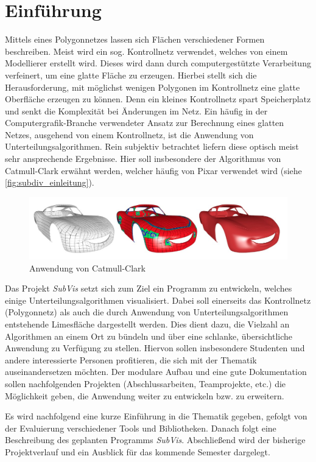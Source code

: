 \chapter{Einführung}

Mittels eines Polygonnetzes lassen sich Flächen verschiedener Formen beschreiben. 
Meist wird ein sog. Kontrollnetz verwendet, welches von einem Modellierer erstellt wird.
Dieses wird dann durch computergestützte Verarbeitung verfeinert, um eine glatte Fläche zu erzeugen.
Hierbei stellt sich die Herausforderung, mit möglichst wenigen Polygonen im Kontrollnetz eine glatte Oberfläche erzeugen zu können.
Denn ein kleines Kontrollnetz spart Speicherplatz und senkt die Komplexität bei Änderungen im Netz.
Ein häufig in der Computergrafik-Branche verwendeter Ansatz zur Berechnung eines glatten Netzes, ausgehend von einem Kontrollnetz, ist die Anwendung von Unterteilungsalgorithmen.
Rein subjektiv betrachtet liefern diese optisch meist sehr ansprechende Ergebnisse.
Hier soll insbesondere der Algorithmus von Catmull-Clark erwähnt werden, welcher häufig von Pixar verwendet wird (siehe \autoref{fig:subdiv_einleitung}).

\begin{figure}
  \centering
  \includegraphics[width=\textwidth]{content/media/sd_einleitung.jpg}
  \caption{Anwendung von Catmull-Clark \cite{niessner2012feature}}
  \label{fig:subdiv_einleitung}
\end{figure}


Das Projekt \emph{SubVis} setzt sich zum Ziel ein Programm zu entwickeln, welches einige Unterteilungsalgorithmen visualisiert. 
Dabei soll einerseits das Kontrollnetz (Polygonnetz) als auch die durch Anwendung von Unterteilungsalgorithmen entstehende Limesfläche dargestellt werden.
Dies dient dazu, die Vielzahl an Algorithmen an einem Ort zu bündeln und über eine schlanke, übersichtliche Anwendung zu Verfügung zu stellen.
Hiervon sollen insbesondere Studenten und andere interessierte Personen profitieren, die sich mit der Thematik auseinandersetzen möchten.
Der modulare Aufbau und eine gute Dokumentation sollen nachfolgenden Projekten (Abschlussarbeiten, Teamprojekte, etc.) die Möglichkeit geben, die Anwendung weiter zu entwickeln bzw. zu erweitern.

Es wird nachfolgend eine kurze Einführung in die Thematik gegeben, gefolgt von der Evaluierung verschiedener Tools und Bibliotheken. 
Danach folgt eine Beschreibung des geplanten Programms \emph{SubVis}.
Abschließend wird der bisherige Projektverlauf und ein Ausblick für das kommende Semester dargelegt.